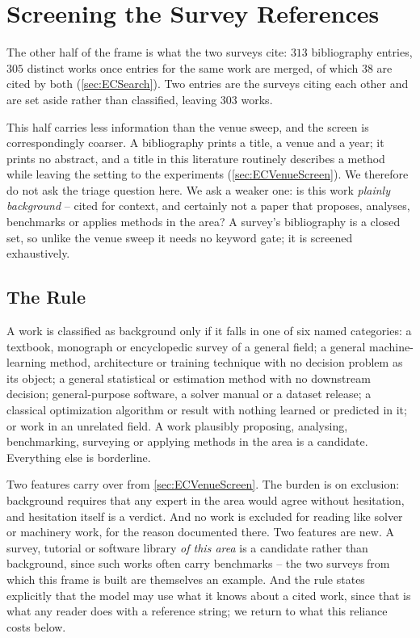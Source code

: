 \section{Screening the Survey References}
\label{sec:ECSurveyScreen}

The other half of the frame is what the two surveys cite: \(313\) bibliography entries, \(305\)
distinct works once entries for the same work are merged, of which \(38\) are cited by both
(\cref{sec:ECSearch}). Two entries are the surveys citing each other and are set aside rather than
classified, leaving \(303\) works.

This half carries less information than the venue sweep, and the screen is correspondingly coarser.
A bibliography prints a title, a venue and a year; it prints no abstract, and a title in this
literature routinely describes a method while leaving the setting to the experiments
(\cref{sec:ECVenueScreen}). We therefore do not ask the triage question here. We ask a weaker one: is
this work \emph{plainly background} -- cited for context, and certainly not a paper that proposes,
analyses, benchmarks or applies methods in the area? A survey's bibliography is a closed set, so
unlike the venue sweep it needs no keyword gate; it is screened exhaustively.

\subsection{The Rule}

A work is classified as background only if it falls in one of six named categories: a textbook,
monograph or encyclopedic survey of a general field; a general machine-learning method,
architecture or training technique with no decision problem as its object; a general statistical or
estimation method with no downstream decision; general-purpose software, a solver manual or a
dataset release; a classical optimization algorithm or result with nothing learned or predicted in
it; or work in an unrelated field. A work plausibly proposing, analysing, benchmarking, surveying or
applying methods in the area is a candidate. Everything else is borderline.

Two features carry over from \cref{sec:ECVenueScreen}. The burden is on exclusion: background requires
that any expert in the area would agree without hesitation, and hesitation itself is a verdict.
And no work is excluded for reading like solver or machinery work, for the reason documented there.
Two features are new. A survey, tutorial or software library \emph{of this area} is a candidate
rather than background, since such works often carry benchmarks -- the two surveys from which this
frame is built are themselves an example. And the rule states explicitly that the model may use what it knows about a
cited work, since that is what any reader does with a reference string; we return to what this
reliance costs below.

